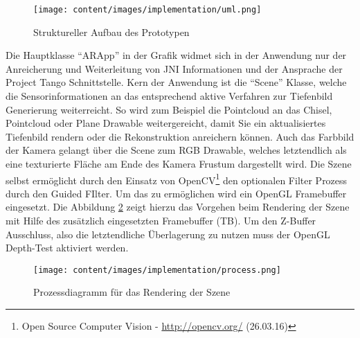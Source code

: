 \begin{figure}[h]
  \centering
	\texttt{[image: content/images/implementation/uml.png]} 
  \caption{Struktureller Aufbau des Prototypen}
  \label{fig:structure}
\end{figure}

Die Hauptklasse \enquote{ARApp} in der Grafik widmet sich in der Anwendung nur der Anreicherung und Weiterleitung von JNI Informationen und der Ansprache der Project Tango Schnittstelle. Kern der Anwendung ist die \enquote{Scene} Klasse, welche die Sensorinformationen an das entsprechend aktive Verfahren zur Tiefenbild Generierung weiterreicht. So wird zum Beispiel die Pointcloud an das Chisel, Pointcloud oder Plane Drawable weitergereicht, damit Sie ein aktualisiertes Tiefenbild rendern oder die Rekonstruktion anreichern können. Auch das Farbbild der Kamera gelangt über die Scene zum RGB Drawable, welches letztendlich als eine texturierte Fläche am Ende des Kamera Frustum dargestellt wird. Die Szene selbst ermöglicht durch den Einsatz von OpenCV\footnote{Open Source Computer Vision - \url{http://opencv.org/} (26.03.16)} den optionalen Filter Prozess durch den Guided FIlter. Um das zu ermöglichen wird ein OpenGL Framebuffer eingesetzt. Die Abbildung \ref{fig:rendering-process} zeigt hierzu das Vorgehen beim Rendering der Szene mit Hilfe des zusätzlich eingesetzten Framebuffer (TB). Um den Z-Buffer Ausschluss, also die letztendliche Überlagerung zu nutzen muss der OpenGL Depth-Test aktiviert werden.


\begin{figure}[h]
  \centering
	\texttt{[image: content/images/implementation/process.png]} 
  \caption{Prozessdiagramm für das Rendering der Szene}
  \label{fig:rendering-process}
\end{figure}